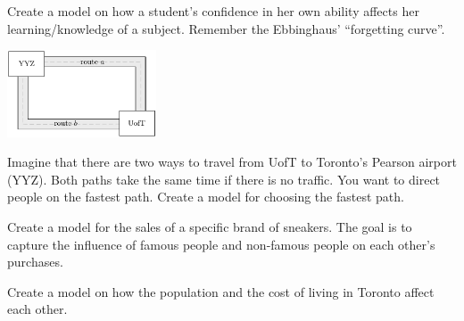 \begin{exercises}
\begin{problist}
	\prob Create a model on how a student's confidence in her own ability affects her learning/knowledge of a subject. Remember the Ebbinghaus' ``forgetting curve''.

	\begin{center}
		\includegraphics*[width=125pt]{images/module16-UofT2YYZ.pdf}	
	\end{center}

	\prob Imagine that there are two ways to travel from UofT to Toronto's Pearson airport (YYZ). Both paths take the same time if there is no traffic. You want to direct people on the fastest path. Create a model for choosing the fastest path.
	
	
	\prob Create a model for the sales of a specific brand of sneakers. The goal is to capture the influence of famous people and non-famous people on each other's purchases.
	
	\prob Create a model on how the population and the cost of living in Toronto affect each other.
	
	
	\end{problist}
\end{exercises}
